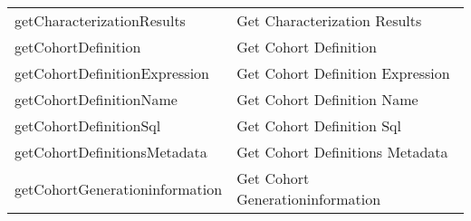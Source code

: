 \documentclass[
]{article}
\begin{document}
\begin{longtable}[]{@{}ll@{}}
\begin{minipage}[t]{0.46\columnwidth}\raggedright
getCharacterizationResults\strut
\end{minipage} & \begin{minipage}[t]{0.48\columnwidth}\raggedright
Get Characterization Results\strut
\end{minipage}\tabularnewline
\begin{minipage}[t]{0.46\columnwidth}\raggedright
getCohortDefinition\strut
\end{minipage} & \begin{minipage}[t]{0.48\columnwidth}\raggedright
Get Cohort Definition\strut
\end{minipage}\tabularnewline
\begin{minipage}[t]{0.46\columnwidth}\raggedright
getCohortDefinitionExpression\strut
\end{minipage} & \begin{minipage}[t]{0.48\columnwidth}\raggedright
Get Cohort Definition Expression\strut
\end{minipage}\tabularnewline
\begin{minipage}[t]{0.46\columnwidth}\raggedright
getCohortDefinitionName\strut
\end{minipage} & \begin{minipage}[t]{0.48\columnwidth}\raggedright
Get Cohort Definition Name\strut
\end{minipage}\tabularnewline
\begin{minipage}[t]{0.46\columnwidth}\raggedright
getCohortDefinitionSql\strut
\end{minipage} & \begin{minipage}[t]{0.48\columnwidth}\raggedright
Get Cohort Definition Sql\strut
\end{minipage}\tabularnewline
\begin{minipage}[t]{0.46\columnwidth}\raggedright
getCohortDefinitionsMetadata\strut
\end{minipage} & \begin{minipage}[t]{0.48\columnwidth}\raggedright
Get Cohort Definitions Metadata\strut
\end{minipage}\tabularnewline
\begin{minipage}[t]{0.46\columnwidth}\raggedright
getCohortGenerationinformation\strut
\end{minipage} & \begin{minipage}[t]{0.48\columnwidth}\raggedright
Get Cohort Generationinformation\strut
\end{minipage}\tabularnewline

\end{longtable}
\end{document}

